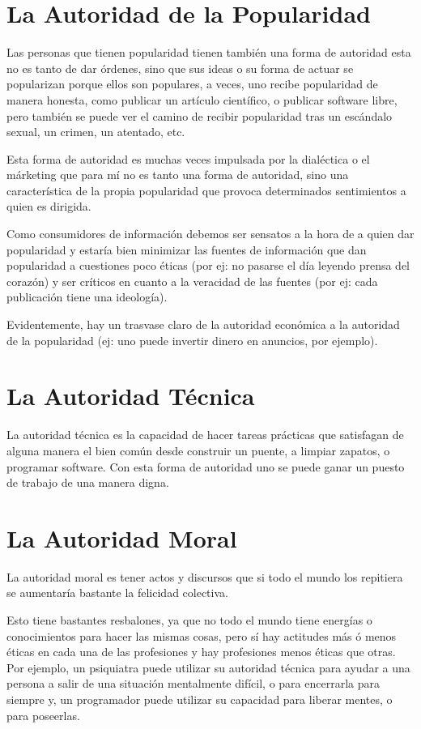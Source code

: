 \documentclass[11pt]{article}
\begin{document}
\section{La Autoridad de la Popularidad}
\label{sec-3}

Las personas que tienen popularidad tienen también una forma de
autoridad esta no es tanto de dar órdenes, sino que sus ideas o su
forma de actuar se popularizan porque ellos son populares, a veces,
uno recibe popularidad de manera honesta, como publicar un artículo
científico, o publicar software libre, pero también se puede ver el
camino de recibir popularidad tras un escándalo sexual, un crimen, un
atentado, etc. 

Esta forma de autoridad es muchas veces impulsada por la dialéctica o
el márketing que para mí no es tanto una forma de autoridad, sino una
característica de la propia popularidad que provoca determinados
sentimientos a quien es dirigida.

Como consumidores de información debemos ser sensatos a la hora de a
quien dar popularidad y estaría bien minimizar las fuentes de
información que dan popularidad a cuestiones poco éticas (por ej: no
pasarse el día leyendo prensa del corazón) y ser críticos en cuanto a
la veracidad de las fuentes (por ej: cada publicación tiene una
ideología).

Evidentemente, hay un trasvase claro de la autoridad económica a la
autoridad de la popularidad (ej: uno puede invertir dinero en
anuncios, por ejemplo).
\section{La Autoridad Técnica}
\label{sec-4}

La autoridad técnica es la capacidad de hacer tareas prácticas que
satisfagan de alguna manera el bien común desde construir un puente, a
limpiar zapatos, o programar software. Con esta forma de autoridad uno
se puede ganar un puesto de trabajo de una manera digna.
\section{La Autoridad Moral}
\label{sec-5}

La autoridad moral es tener actos y discursos que si todo el mundo los
repitiera se aumentaría bastante la felicidad colectiva. 

Esto tiene bastantes resbalones, ya que no todo el mundo tiene
energías o conocimientos para hacer las mismas cosas, pero sí hay
actitudes más ó menos éticas en cada una de las profesiones y hay
profesiones menos éticas que otras. Por ejemplo, un psiquiatra puede
utilizar su autoridad técnica para ayudar a una persona a salir de una
situación mentalmente difícil, o para encerrarla para siempre y, un
programador puede utilizar su capacidad para liberar mentes, o para
poseerlas.
\end{document}

